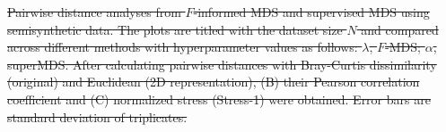 \documentclass[11pt]{article}
\newcommand{\1}{{\rm 1}\kern-0.24em{\rm I}}
\providecommand{\DIFdeltex}[1]{{\protect\color{red}\sout{#1}}}                      %
\providecommand{\DIFdelbegin}{} %
\providecommand{\DIFdelend}{} %
\providecommand{\DIFdelFL}[1]{\DIFdel{#1}} %
\providecommand{\DIFdel}[1]{\texorpdfstring{\DIFdeltex{#1}}{}} %
\newcommand{\DIFscaledelfig}{0.5}
\newlength{\DIFdelgraphicswidth} %
\newlength{\DIFdelgraphicsheight} %
\newcommand{\DIFdelincludegraphics}[2][]{%
\sbox{\DIFdelgraphicsbox}{\DIFOincludegraphics[#1]{#2}}%
\settoboxwidth{\DIFdelgraphicswidth}{\DIFdelgraphicsbox} %
\settoboxtotalheight{\DIFdelgraphicsheight}{\DIFdelgraphicsbox} %
\scalebox{\DIFscaledelfig}{%
\parbox[b]{\DIFdelgraphicswidth}{\usebox{\DIFdelgraphicsbox}\\[-\baselineskip] \rule{\DIFdelgraphicswidth}{0em}}\llap{\resizebox{\DIFdelgraphicswidth}{\DIFdelgraphicsheight}{%
\setlength{\unitlength}{\DIFdelgraphicswidth}%
\begin{picture}(1,1)%
\thicklines\linethickness{2pt} %
{\color[rgb]{1,0,0}\put(0,0){\framebox(1,1){}}}%
{\color[rgb]{1,0,0}\put(0,0){\line( 1,1){1}}}%
{\color[rgb]{1,0,0}\put(0,1){\line(1,-1){1}}}%
\end{picture}%
}\hspace*{3pt}}} %
} %
\DeclareRobustCommand{\DIFdelbegin}{\DIFOdelbegin \let\includegraphics\DIFdelincludegraphics} %
\DeclareRobustCommand{\DIFdelend}{\DIFOaddend \let\includegraphics\DIFOincludegraphics} %
\begin{document}
\DIFdelbegin %
{%
\DIFdelFL{Pairwise distance analyses from $F$-informed MDS and supervised MDS using semisynthetic data. The plots are titled with the dataset size $N$ and compared across different methods with hyperparameter values as follows: $\lambda$, $F$-MDS; $\alpha$, superMDS. After calculating pairwise distances with Bray-Curtis dissimilarity (original) and Euclidean (2D representation), (B) their Pearson correlation coefficient and (C) normalized stress (Stress-1) were obtained. Error bars are standard deviation of triplicates.}}
\DIFdelend %
\end{document}
